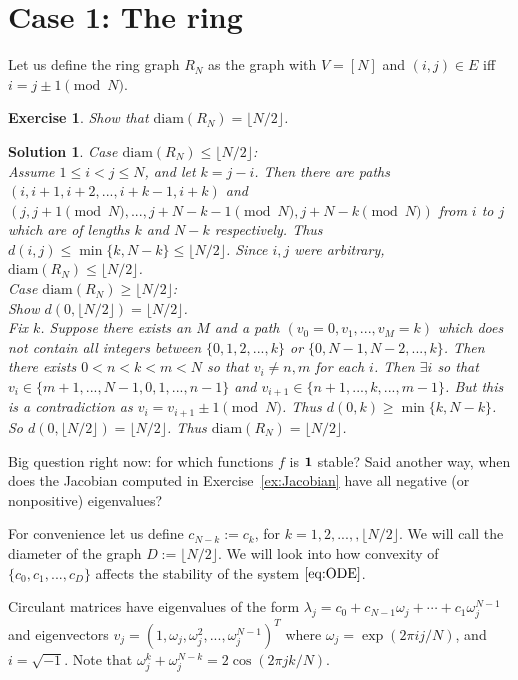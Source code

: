 \documentclass{article}
\newtheorem{exercise}[thm]{Exercise}
\newtheorem{soln}[thm]{Solution}
\newcommand{\1}{\mathbf{1}}
\newcommand{\0}{\mathbf{0}}
\newcommand{\diam}{\mathrm{diam}}
\begin{document}
\section{Case 1:  The ring}

Let us define the ring graph $R_N$ as the graph with $V=[N]$ and $(i,j)\in E$ iff $i=j\pm 1\pmod N$.  

\begin{exercise}
Show that $\diam(R_N) = \lfloor N/2 \rfloor$.
\end{exercise}
\begin{soln}
Case $\diam(R_N) \leq \lfloor N/2\rfloor$: \\
Assume $1 \leq i < j \leq N$, and let $k=j-i$.  
Then there are paths $(i,i+1,i+2,...,i+k-1,i+k)$ and $(j,j+1 \pmod N,...,j+N-k-1 \pmod N,j+N-k \pmod N)$ from $i$ to $j$ which are of lengths $k$ and $N-k$ respectively.  
Thus $d(i,j) \leq \min\{ k, N-k \} \leq \lfloor N/2\rfloor$.  
Since $i,j$ were arbitrary, $\diam(R_N) \leq \lfloor N/2\rfloor$. \\
Case $\diam(R_N) \geq \lfloor N/2\rfloor$: \\
Show $d(0,\lfloor N/2 \rfloor) = \lfloor N/2\rfloor$.  \\
Fix $k$.  Suppose there exists an $M$ and a path $(v_0=0,v_1,...,v_M=k)$ which does not contain all integers between $\{ 0,1,2,...,k \}$ or $\{ 0,N-1,N-2,...,k \}$.  
Then there exists $0<n<k<m<N$ so that $v_i \neq n,m$ for each $i$.  
Then $\exists i$ so that $v_i \in \{ m+1,...,N-1,0,1,...,n-1 \}$ and $v_{i+1} \in \{ n+1,...,k,...,m-1 \}$.  
But this is a contradiction as $v_i=v_{i+1} \pm 1 \pmod N$.  
Thus $d(0,k) \geq \min\{k,N-k \}$.  So $d(0,\lfloor N/2 \rfloor) = \lfloor N/2\rfloor$.
Thus $\diam(R_N) = \lfloor N/2\rfloor$.
\end{soln}


Big question right now:  for which functions $f$ is ${\bf 1}$ stable?  Said another way, when does the Jacobian computed in Exercise~\ref{ex:Jacobian} have all negative (or nonpositive) eigenvalues?

For convenience let us define $c_{N-k} := c_k$, for $k =1,2,...,,\lfloor N/2 \rfloor$.  
We will call the diameter of the graph $D:= \lfloor N/2 \rfloor$.
We will look into how convexity of $\{ c_0,c_1,...,c_D \}$ affects the stability of the system $\ref{eq:ODE}$.

Circulant matrices have eigenvalues of the form $\lambda_j = c_0 + c_{N-1} \omega_j + \cdots + c_1 \omega_j^{N-1}$ and eigenvectors $v_j = (1,\omega_j,\omega_j^2,...,\omega_j^{N-1})^T$ where $\omega_j = \exp(2\pi i j/N)$, and $i = \sqrt{-1}$.  
Note that $\omega_j^k +\omega_j^{N-k} = 2\cos(2\pi j k/N)$.  
\end{document}
